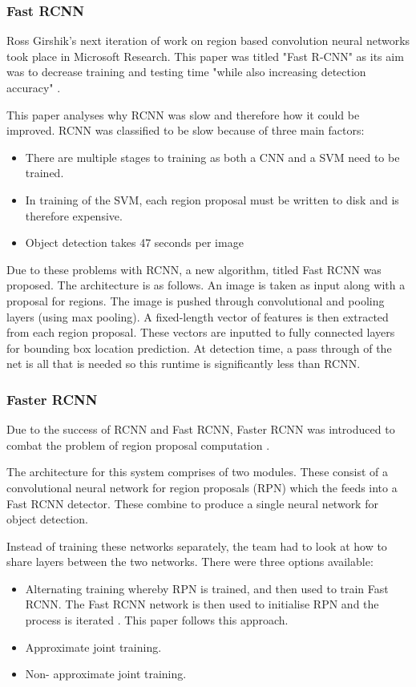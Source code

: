 \subsubsection*{Fast RCNN}
Ross Girshik's next iteration of work on region based convolution neural
networks took place in Microsoft Research. This paper was titled "Fast R-CNN" as
its aim was to decrease training and testing time "while also increasing
detection accuracy" \parencite{fastRcnn}.

This paper analyses why RCNN \parencite{rcnn} was slow and therefore how it could be improved.
RCNN was classified to be slow because of three main factors:
\begin{itemize}
	\item{There are multiple stages to training as both a CNN and a SVM need to
		be trained.}
	\item{In training of the SVM, each region proposal must be written to disk
		and is therefore expensive.}
	\item{Object detection takes 47 seconds per image}
\end{itemize}

Due to these problems with RCNN, a new algorithm, titled Fast RCNN was proposed.
The architecture is as follows. An image is taken as input along with a
proposal for regions. The image is pushed through convolutional and pooling
layers (using max pooling). A fixed-length vector of features is then extracted
from each region proposal. These vectors are inputted to fully connected
layers for bounding box location prediction.
At detection time, a pass through of the net is all that is needed so this
runtime is significantly less than RCNN.

\subsubsection*{Faster RCNN}
Due to the success of RCNN and Fast RCNN, Faster RCNN was introduced to combat
the problem of region proposal computation \parencite{fasterRcnn}.

The architecture for this system comprises of two modules. These consist of a
convolutional neural network for region proposals (RPN) which the feeds into a Fast
RCNN detector. These combine to produce a single neural network for object
detection.

Instead of training these networks separately, the team had to look at how to
share layers between the two networks. There were three options available:
\begin{itemize}
    \item{Alternating training whereby RPN is trained, and then used to train
        Fast RCNN. The Fast RCNN network is then used to initialise RPN and the
		process is iterated \parencite{fasterRcnn}. This paper follows this approach.}
    \item{Approximate joint training.}
    \item{Non- approximate joint training.}
\end{itemize}

